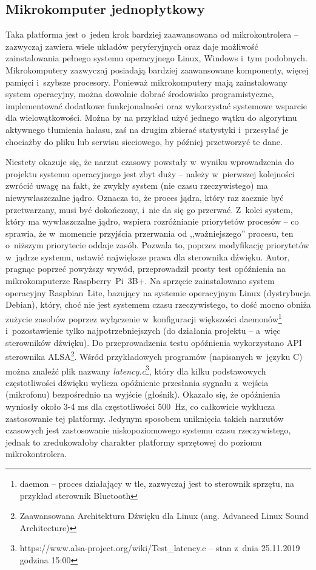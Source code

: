 \subsection{Mikrokomputer jednopłytkowy}
\label{mikrokomp}
Taka platforma jest o~jeden krok bardziej zaawansowana od mikrokontrolera -- zazwyczaj zawiera wiele układów peryferyjnych oraz daje możliwość zainstalowania pełnego systemu operacyjnego Linux, Windows i~tym podobnych. Mikrokomputery zazwyczaj posiadają bardziej zaawansowane komponenty, więcej pamięci i~szybsze procesory. Ponieważ mikrokomputery mają zainstalowany system operacyjny, można dowolnie dobrać środowisko programistyczne, implementować dodatkowe funkcjonalności oraz wykorzystać systemowe wsparcie dla wielowątkowości. Można by na przykład użyć jednego wątku do algorytmu aktywnego tłumienia hałasu, zaś na drugim zbierać statystyki i~przesyłać je chociażby do pliku lub serwisu sieciowego, by później przetworzyć te dane.

Niestety okazuje się, że narzut czasowy powstały w~wyniku wprowadzenia do projektu systemu operacyjnego jest zbyt duży -- należy w~pierwszej kolejności zwrócić uwagę na fakt, że zwykły system (nie czasu rzeczywistego) ma niewywłaszczalne jądro. Oznacza to, że proces jądra, który raz zacznie być przetwarzany, musi być dokończony, i~nie da się go przerwać. Z~kolei system, który ma wywłaszczalne jądro, wspiera rozróżnianie priorytetów procesów -- co sprawia, że w~momencie przyjścia przerwania od ,,ważniejszego'' procesu, ten o~niższym priorytecie oddaje zasób. Pozwala to, poprzez modyfikację priorytetów w~jądrze systemu, ustawić największe prawa dla sterownika dźwięku.
Autor, pragnąc poprzeć powyższy wywód, przeprowadził prosty test opóźnienia na mikrokomputerze Raspberry~Pi~3B+. Na sprzęcie zainstalowano system operacyjny Raspbian~Lite, bazujący na systemie operacyjnym Linux (dystrybucja Debian), który, choć nie jest systemem czasu rzeczywistego, to dość mocno obniża zużycie zasobów poprzez wyłączenie w~konfiguracji większości daemonów\footnote{daemon -- proces działający w tle, zazwyczaj jest to sterownik sprzętu, na przykład sterownik Bluetooth} i~pozostawienie tylko najpotrzebniejszych (do działania projektu -- a~więc sterowników dźwięku). Do przeprowadzenia testu opóźnienia wykorzystano API sterownika ALSA\footnote{Zaawansowana Architektura Dźwięku dla Linux (ang. Advanced Linux Sound Architecture)}. Wśród przykładowych programów (napisanych w~języku C) można znaleźć plik nazwany \textit{latency.c}\footnote{https://www.alsa-project.org/wiki/Test\_latency.c -- stan z~dnia 25.11.2019 godzina 15:00}, który dla kilku podstawowych częstotliwości dźwięku wylicza opóźnienie przesłania sygnału z~wejścia (mikrofonu) bezpośrednio na wyjście (głośnik). Okazało się, że opóźnienia wyniosły około 3-4 ms dla częstotliwości \SI{500}{\Hz}, co całkowicie wyklucza zastosowanie tej platformy. Jedynym sposobem uniknięcia takich narzutów czasowych jest zastosowanie niskopoziomowego systemu czasu rzeczywistego, jednak to zredukowałoby charakter platformy sprzętowej do poziomu mikrokontrolera.
